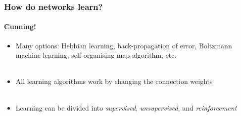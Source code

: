 \documentclass{beamer}
\begin{document}
\begin{frame}
\frametitle{How do networks learn?}
\framesubtitle{Cunning!}
\begin{itemize}
\item Many options: Hebbian learning, back-propagation of error, Boltzmann machine learning, self-organising map algorithm, etc. \\ \

\item All learning algorithms work by changing the connection weights \\ \

\item Learning can be divided into \emph{supervised}, \emph{unsupervised}, and \emph{reinforcement} \\ \ \end{itemize}
\end{frame}
\end{document}
